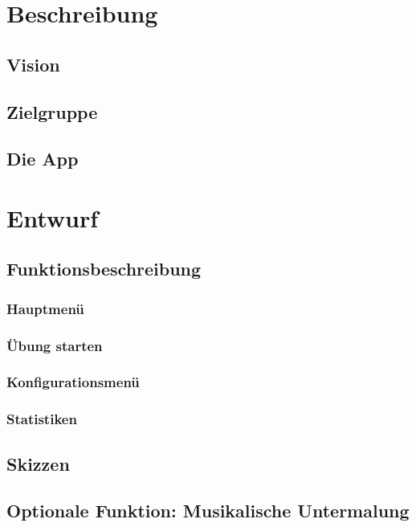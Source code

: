 
\section{Beschreibung}

\subsection{Vision}
\subsection{Zielgruppe}
\subsection{Die App}

\section{Entwurf}

\subsection{Funktionsbeschreibung}
\subsubsection{Hauptmenü}
\subsubsection{Übung starten}
\subsubsection{Konfigurationsmenü}
\subsubsection{Statistiken}

\subsection{Skizzen}
\subsection{Optionale Funktion: Musikalische Untermalung}



